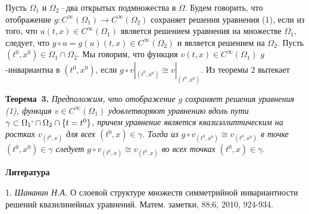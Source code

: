 Пусть $\Omega_1$ и $\Omega_2$\,--\,два открытых подмножества в $\Omega$.
Будем говорить, что отображение
$g:C^{\infty}(\Omega_1)\to C^{\infty}(\Omega_2)$
сохраняет решения уравнения (1),
если из того, что $u(t,x)\in C^{\infty}(\Omega_1)$ является решением уравнения
на множестве $\Omega_1$, следует, что $g\circ u=g(u)(t,x)\in C^{\infty}(\Omega_2)$
и является решением на $\Omega_2$. Пусть $(t^0,x^0)\in \Omega_1\cap\Omega_2$.
Мы говорим, что функция $v(t,x)\in C^{\infty}(\Omega_1)$ $g$-инвариантна в $(t^0,x^0)$, если  $g\circ v|_{(t^0,x^0)}\cong v|_{(t^0,x^0)}$. Из теоремы 2
вытекает

\textbf{Теорема~3.} {\it
Предположим, что отображение $g$ сохраняет решения уравнения {\rm (1)},
функция $v\in C^{\infty}(\Omega_1)$ удовлетворяют уравнению вдоль пути $\gamma\subset\Omega_1`\cap\Omega_2\cap\{t=t^0\}$, причем  уравнение
является квазиэллиптическим на ростках  $v_{(t^0,x)}$ для всех $(t^0,x)\in\gamma$. Тогда из $g\circ v_{(t^0,x^0)}\cong v_{(t^0,x^0)}$ в точке
$(t^0,x^0)\in\gamma$ следует $g\circ v_{(t^0,x)}\cong v_{(t^0,x)}$ во всех точках
$(t^0,x)\in\gamma$.
}




\smallskip \centerline {\bf Литература} \nopagebreak

1. {\it Шананин Н.А.} О слоевой структуре множеств симметрийной инвариантности решений квазилинейных уравнений. Матем. заметки, 88:6, 2010, 924-934.




